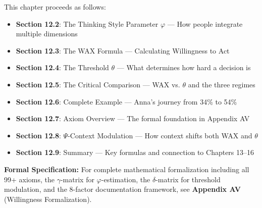 This chapter proceeds as follows:

\begin{itemize}
\item \textbf{Section 12.2}: The Thinking Style Parameter $\varphi$ — How people integrate multiple dimensions
\item \textbf{Section 12.3}: The WAX Formula — Calculating Willingness to Act
\item \textbf{Section 12.4}: The Threshold $\theta$ — What determines how hard a decision is
\item \textbf{Section 12.5}: The Critical Comparison — WAX vs. $\theta$ and the three regimes
\item \textbf{Section 12.6}: Complete Example — Anna's journey from 34\% to 54\%
\item \textbf{Section 12.7}: Axiom Overview — The formal foundation in Appendix AV
\item \textbf{Section 12.8}: $\Psi$-Context Modulation — How context shifts both WAX and $\theta$
\item \textbf{Section 12.9}: Summary — Key formulas and connection to Chapters 13--16
\end{itemize}

\begin{cross-reference}
\textbf{Formal Specification:} For complete mathematical formalization including 
all 99+ axioms, the $\gamma$-matrix for $\varphi$-estimation, the $\delta$-matrix 
for threshold modulation, and the 8-factor documentation framework, 
see \textbf{Appendix AV} (Willingness Formalization).
\end{cross-reference}

